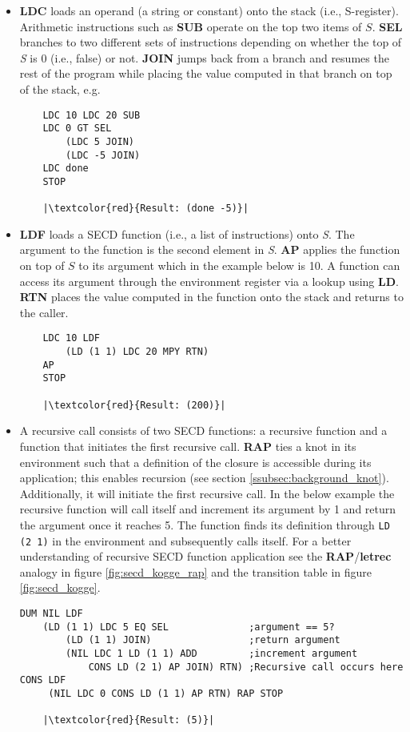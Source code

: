 \documentclass[a4paper,12pt,twoside,openright]{report}
\theoremstyle{definition}
\begin{document}
\begin{itemize}
    \item \textbf{LDC} loads an operand (a string or constant) onto the stack (i.e., S-register). Arithmetic instructions such as \textbf{SUB} operate on the top two items of $S$. \textbf{SEL} branches to two different sets of instructions depending on whether the top of \textit{S} is 0 (i.e., false) or not. \textbf{JOIN} jumps back from a branch and resumes the rest of the program while placing the value computed in that branch on top of the stack, e.g.
\begin{verbatim}
    LDC 10 LDC 20 SUB
    LDC 0 GT SEL
        (LDC 5 JOIN)
        (LDC -5 JOIN)
    LDC done
    STOP
    
    |\textcolor{red}{Result: (done -5)}|
\end{verbatim}
    \item \textbf{LDF} loads a SECD function (i.e., a list of instructions) onto \textit{S}. The argument to the function is the second element in \textit{S}. \textbf{AP} applies the function on top of $S$ to its argument which in the example below is 10. A function can access its argument through the environment register via a lookup using \textbf{LD}. \textbf{RTN} places the value computed in the function onto the stack and returns to the caller.
\begin{verbatim}
    LDC 10 LDF
        (LD (1 1) LDC 20 MPY RTN)
    AP
    STOP

    |\textcolor{red}{Result: (200)}|
\end{verbatim}
\newpage
    \item A recursive call consists of two SECD functions: a recursive function and a function that initiates the first recursive call. \textbf{RAP} ties a knot in its environment such that a definition of the closure is accessible during its application; this enables recursion (see section \ref{ssubsec:background_knot}). Additionally, it will initiate the first recursive call. In the below example the recursive function will call itself and increment its argument by 1 and return the argument once it reaches 5. The function finds its definition through \texttt{LD (2 1)} in the environment and subsequently calls itself. For a better understanding of recursive SECD function application see the \textbf{RAP}/\textbf{letrec} analogy in figure \ref{fig:secd_kogge_rap} and the transition table in figure \ref{fig:secd_kogge}.
\begin{verbatim}
DUM NIL LDF
    (LD (1 1) LDC 5 EQ SEL              ;argument == 5?
        (LD (1 1) JOIN)                 ;return argument
        (NIL LDC 1 LD (1 1) ADD         ;increment argument
            CONS LD (2 1) AP JOIN) RTN) ;Recursive call occurs here
CONS LDF
     (NIL LDC 0 CONS LD (1 1) AP RTN) RAP STOP

    |\textcolor{red}{Result: (5)}|
\end{verbatim}
\end{itemize}
\end{document}

